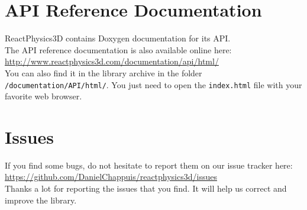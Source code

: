 \documentclass[a4paper,12pt]{article}
\begin{document}
   \section{API Reference Documentation}

   ReactPhysics3D contains Doxygen documentation for its API. \\

   The API reference documentation is also available online here: \url{http://www.reactphysics3d.com/documentation/api/html/} \\

   You can also find it in the library archive in the folder \texttt{/documentation/API/html/}. You just
   need to open the \texttt{index.html} file with your favorite web browser. 

   \section{Issues}

   If you find some bugs, do not hesitate to report them on our issue tracker here: \\

   \url{https://github.com/DanielChappuis/reactphysics3d/issues} \\

   Thanks a lot for reporting the issues that you find. It will help us correct and improve the library.
\end{document}

